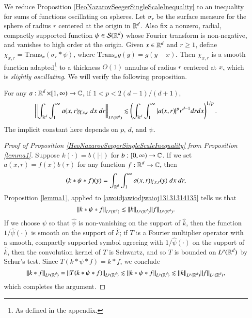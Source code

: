 We reduce Proposition \ref{HeoNazarovSeegerSingleScaleInequality} to an inequality for sums of functions oscillating on spheres. Let $\sigma_r$ be the surface measure for the sphere of radius $r$ centered at the origin in $\operatorname{\mathbb{R}}^d$. Also fix a nonzero, radial, compactly supported function $\psi \in \mathcal{S}(\operatorname{\mathbb{R}}^d)$ whose Fourier transform is non-negative, and vanishes to high order at the origin. Given $x \in \operatorname{\mathbb{R}}^d$ and $r \geq 1$, define $\chi_{x, r} = \text{Trans}_x (\sigma_r * \psi)$, where $\text{Trans}_x g(y) = g(y - x)$. Then $\chi_{x,r}$ is a smooth function adapted\footnote{As defined in the appendix.} to a thickness $O(1)$ annulus of radius $r$ centered at $x$, which is \emph{slightly oscillating}. We will verify the following proposition.

\begin{prop} \label{lemma1}
    For any $a : \operatorname{\mathbb{R}}^d \times [1,\infty) \to \operatorname{\mathbb{C}}$, if $1 < p < 2(d-1)/(d+1)$,
    \[ \left\| \int_{\operatorname{\mathbb{R}}^d} \int_1^\infty a(x,r) \chi_{x, r}\; dx\; dr \right\|_{L^p(\operatorname{\mathbb{R}}^d)} \lesssim \left( \int_{\operatorname{\mathbb{R}}^d} \int_1^\infty |a(x,r)|^p r^{d-1} dr dx \right)^{1/p}. \]
    The implicit constant here depends on $p$, $d$, and $\psi$.
\end{prop}

\begin{proof}[Proof of Proposition \ref{HeoNazarovSeegerSingleScaleInequality} from Proposition \ref{lemma1}] Suppose $k(\cdot) = b(|\cdot|)$ for $b: [0,\infty) \to \operatorname{\mathbb{C}}$. If we set $a(x,r) = f(x) b(r)$ for any function $f: \operatorname{\mathbb{R}}^d \to \operatorname{\mathbb{C}}$, then
%
\begin{equation} \label{awoidjawiodjwaioj13131314135}
  (k * \psi * f)(y) = \int_{\operatorname{\mathbb{R}}^d} \int_1^\infty a(x,r) \chi_{x, r}(y)\; dx\; dr,
\end{equation}
%
Proposition \ref{lemma1}, applied to \eqref{awoidjawiodjwaioj13131314135} tells us that
%
\begin{equation}
  \| k * \psi * f \|_{L^p(\operatorname{\mathbb{R}}^d)} \lesssim \| k \|_{L^p(\operatorname{\mathbb{R}}^d)} \| f \|_{L^p(\operatorname{\mathbb{R}}^d)}.
\end{equation}
%
If we choose $\psi$ so that $\widehat{\psi}$ is non-vanishing on the support of $\widehat{k}$, then the function $1/\widehat{\psi}(\cdot)$ is smooth on the support of $\widehat{k}$; if $T$ is a Fourier multiplier operator with a smooth, compactly supported symbol agreeing with $1/\widehat{\psi}(\cdot)$ on the support of $\widehat{k}$, then the convolution kernel of $T$ is Schwartz, and so $T$ is bounded on $L^p(\operatorname{\mathbb{R}}^d)$ by Schur's test. Since $T(k * \psi * f) = k * f$, we conclude
%
\begin{equation}
  \| k * f \|_{L^p(\operatorname{\mathbb{R}}^d)} = \| T(k * \psi * f) \|_{L^p(\operatorname{\mathbb{R}}^d)} \lesssim \| k * \psi * f \|_{L^p(\operatorname{\mathbb{R}}^d)} \lesssim \| k \|_{L^p(\operatorname{\mathbb{R}}^d)} \| f \|_{L^p(\operatorname{\mathbb{R}}^d)},
\end{equation}
%
which completes the argument.
\end{proof}

